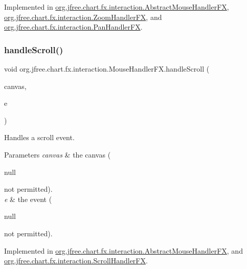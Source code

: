 Implemented in \mbox{\hyperlink{classorg_1_1jfree_1_1chart_1_1fx_1_1interaction_1_1_abstract_mouse_handler_f_x_af21b170ff087139926d7cca2ac1c7479}{org.\+jfree.\+chart.\+fx.\+interaction.\+Abstract\+Mouse\+Handler\+FX}}, \mbox{\hyperlink{classorg_1_1jfree_1_1chart_1_1fx_1_1interaction_1_1_zoom_handler_f_x_af47ee1c3f51772d2bbd503c5d6c3ba71}{org.\+jfree.\+chart.\+fx.\+interaction.\+Zoom\+Handler\+FX}}, and \mbox{\hyperlink{classorg_1_1jfree_1_1chart_1_1fx_1_1interaction_1_1_pan_handler_f_x_ade3d5c9bd4ada9f2357231eefc89ff4e}{org.\+jfree.\+chart.\+fx.\+interaction.\+Pan\+Handler\+FX}}.

\mbox{\label{interfaceorg_1_1jfree_1_1chart_1_1fx_1_1interaction_1_1_mouse_handler_f_x_a271047b9229d2fbebbfefe173f153b2e}} 
\subsubsection{\texorpdfstring{handle\+Scroll()}{handleScroll()}}
{\footnotesize\ttfamily void org.\+jfree.\+chart.\+fx.\+interaction.\+Mouse\+Handler\+F\+X.\+handle\+Scroll (\begin{DoxyParamCaption}\item[{\mbox{\hyperlink{classorg_1_1jfree_1_1chart_1_1fx_1_1_chart_canvas}{Chart\+Canvas}}}]{canvas,  }\item[{Scroll\+Event}]{e }\end{DoxyParamCaption})}

Handles a scroll event.


\begin{DoxyParams}{Parameters}
{\em canvas} & the canvas (
\begin{DoxyCode}
null 
\end{DoxyCode}
 not permitted). \\
\hline
{\em e} & the event (
\begin{DoxyCode}
null 
\end{DoxyCode}
 not permitted). \\
\hline
\end{DoxyParams}


Implemented in \mbox{\hyperlink{classorg_1_1jfree_1_1chart_1_1fx_1_1interaction_1_1_abstract_mouse_handler_f_x_a1295d12f1bd621599427b782237b9e0c}{org.\+jfree.\+chart.\+fx.\+interaction.\+Abstract\+Mouse\+Handler\+FX}}, and \mbox{\hyperlink{classorg_1_1jfree_1_1chart_1_1fx_1_1interaction_1_1_scroll_handler_f_x_a59413aa0326296008a59e8c477a203ff}{org.\+jfree.\+chart.\+fx.\+interaction.\+Scroll\+Handler\+FX}}.

